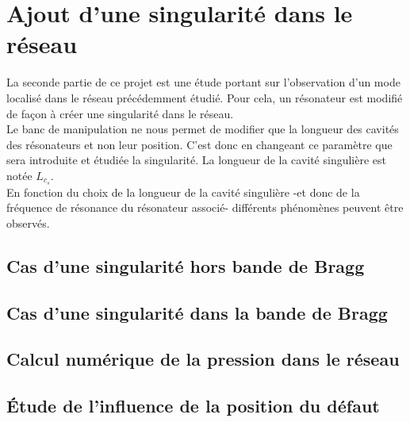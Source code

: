 \chapter{Ajout d'une singularité dans le réseau}
La seconde partie de ce projet est une étude portant sur l'observation d'un mode localisé dans le réseau précédemment étudié. Pour cela, un résonateur est modifié de façon à créer une singularité dans le réseau. \\
Le banc de manipulation ne nous permet de modifier que la longueur des cavités des résonateurs et non leur position. C'est donc en changeant ce paramètre que sera introduite et étudiée la singularité. La longueur de la cavité singulière est notée $L_{c_{s}}$.\\

En fonction du choix de la longueur de la cavité singulière -et donc de la fréquence de résonance du résonateur associé- différents phénomènes peuvent être observés. 


\section{Cas d'une singularité hors bande de Bragg}


\section{Cas d'une singularité dans la bande de Bragg}

\section{Calcul numérique de la pression dans le réseau}

\section{Étude de l'influence de la position du défaut}